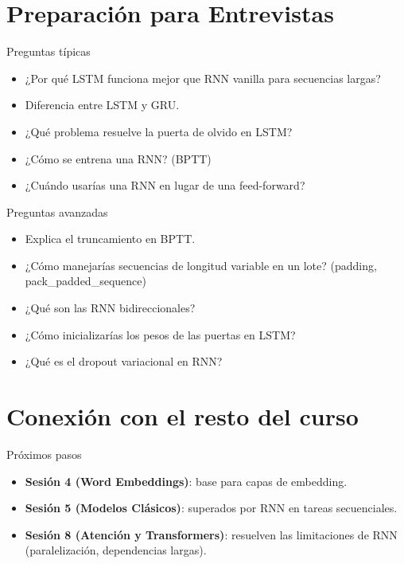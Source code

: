 \documentclass[aspectratio=169, 10pt, xcolor=table]{beamer}
\begin{document}
\section{Preparación para Entrevistas}

\begin{frame}{Preguntas típicas}
    \begin{itemize}
        \item ¿Por qué LSTM funciona mejor que RNN vanilla para secuencias largas?
        \item Diferencia entre LSTM y GRU.
        \item ¿Qué problema resuelve la puerta de olvido en LSTM?
        \item ¿Cómo se entrena una RNN? (BPTT)
        \item ¿Cuándo usarías una RNN en lugar de una feed-forward?
    \end{itemize}
\end{frame}

\begin{frame}{Preguntas avanzadas}
    \begin{itemize}
        \item Explica el truncamiento en BPTT.
        \item ¿Cómo manejarías secuencias de longitud variable en un lote? (padding, pack\_padded\_sequence)
        \item ¿Qué son las RNN bidireccionales?
        \item ¿Cómo inicializarías los pesos de las puertas en LSTM?
        \item ¿Qué es el dropout variacional en RNN?
    \end{itemize}
\end{frame}

\section{Conexión con el resto del curso}

\begin{frame}{Próximos pasos}
    \begin{itemize}
        \item \textbf{Sesión 4 (Word Embeddings)}: base para capas de embedding.
        \item \textbf{Sesión 5 (Modelos Clásicos)}: superados por RNN en tareas secuenciales.
        \item \textbf{Sesión 8 (Atención y Transformers)}: resuelven las limitaciones de RNN (paralelización, dependencias largas).
    \end{itemize}
\end{frame}
\end{document}

